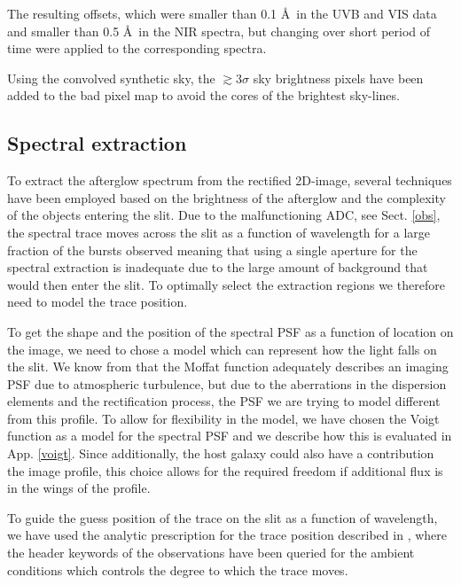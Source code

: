 \documentclass{aa}    %
\begin{document}
The resulting offsets, which were smaller than 0.1 \AA~in the UVB and VIS data
and smaller than 0.5 \AA~in the NIR spectra, but changing over short period of
time were applied to the corresponding spectra.

Using the convolved synthetic sky, the $\gtrsim 3 \sigma$ sky brightness pixels
have been added to the bad pixel map to avoid the cores of the brightest
sky-lines.

\subsection{Spectral extraction}    \label{extract}

To extract the afterglow spectrum from the rectified 2D-image, several
techniques have been employed based on the brightness of the afterglow and the
complexity of the objects entering the slit. Due to the malfunctioning ADC, see
Sect. \ref{obs}, the spectral trace moves across the slit as a function of
wavelength for a large fraction of the bursts observed meaning that using a
single aperture for the spectral extraction is inadequate due to the large
amount of background that would then enter the slit. To optimally select the
extraction regions we therefore need to model the trace position.

To get the shape and the position of the spectral PSF as a function of location
on the image, we need to chose a model which can represent how the light falls
on the slit. We know from \citet{Trujillo2001} that the Moffat function
\citep{Moffat1969} adequately describes an imaging PSF due to atmospheric
turbulence, but due to the aberrations in the dispersion elements and the
rectification process, the PSF we are trying to model different from this
profile. To allow for flexibility in the model, we have chosen the Voigt
function as a model for the spectral PSF and we describe how this is evaluated
in App. \ref{voigt}. Since additionally, the host galaxy could also have a
contribution the image profile, this choice allows for the required freedom if
additional flux is in the wings of the profile.

To guide the guess position of the trace on the slit as a function of
wavelength, we have used the analytic prescription for the trace position
described in \citet{Filippenko1982}, where the header keywords of the
observations have been queried for the ambient conditions which controls the
degree to which the trace moves.
\end{document}
